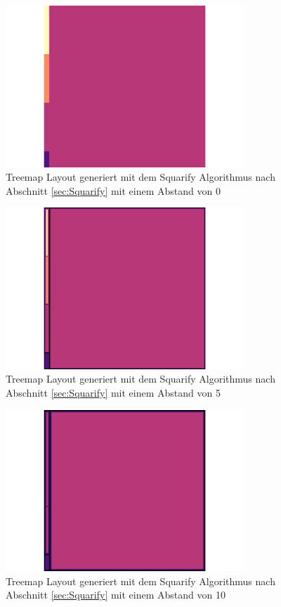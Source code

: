 \begin{figure}
    \centering
    \includegraphics[width=0.8\textwidth]{images/zeroMarginArtificialMap.png}
    \caption{Treemap Layout generiert mit dem Squarify Algorithmus nach Abschnitt \ref{sec:Squarify} mit einem Abstand von 0} 
    \label{fig:zeroMarginArtificialMap}
\end{figure}

\begin{figure}
    \centering
    \includegraphics[width=0.8\textwidth]{images/fiveMarginArtifialMap.png}
    \caption{Treemap Layout generiert mit dem Squarify Algorithmus nach Abschnitt \ref{sec:Squarify} mit einem Abstand von 5} 
    \label{fig:fiveMarginArtificialMap}
\end{figure}

\begin{figure}
    \centering
    \includegraphics[width=0.8\textwidth]{images/tenMarginArtifialMap.png}
    \caption{Treemap Layout generiert mit dem Squarify Algorithmus nach Abschnitt \ref{sec:Squarify} mit einem Abstand von 10} 
    \label{fig:tenMarginArtificialMap}
\end{figure}

